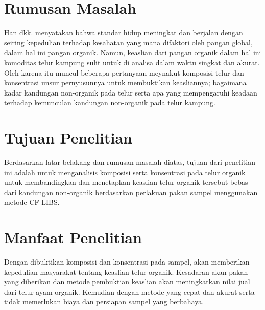 \section{Rumusan Masalah}
\par Han dkk. menyatakan bahwa standar hidup meningkat dan berjalan dengan seiring kepedulian terhadap kesahatan yang mana difaktori oleh pangan global, dalam hal ini pangan organik. Namun, keaslian dari pangan organik dalam hal ini komoditas telur kampung sulit untuk di analisa dalam waktu singkat dan akurat. Oleh karena itu muncul beberapa pertanyaan meynakut komposisi telur dan konsentrasi unsur pernyusunnya untuk membuktikan keasliannya; bagaimana kadar kandungan non-organik pada telur serta apa yang mempengaruhi keadaan terhadap kemunculan kandungan non-organik pada telur kampung.

\section{Tujuan Penelitian}
\par Berdasarkan latar belakang dan rumusan masalah diatas, tujuan dari penelitian ini adalah untuk menganalisis komposisi serta konsentrasi pada telur organik untuk membandingkan dan menetapkan keaslian telur  organik tersebut bebas dari kandungan non-organik berdasarkan perlakuan  pakan sampel menggunakan metode CF-LIBS.

\section{Manfaat Penelitian}
\par Dengan dibuktikan komposisi dan konsentrasi pada sampel, akan memberikan kepedulian masyarakat tentang keaslian telur organik. Kesadaran akan pakan yang diberikan dan metode pembuktian keaslian akan meningkatkan nilai jual dari telur ayam organik. Kemudian dengan metode yang cepat dan akurat serta tidak memerlukan biaya dan persiapan sampel yang berbahaya.



\begin{comment}

\end{comment}
